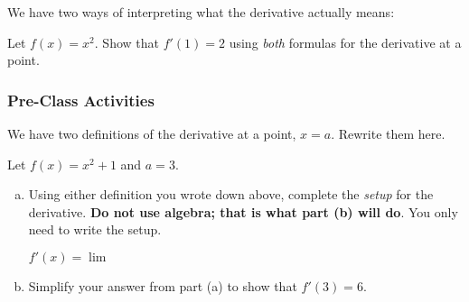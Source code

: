 \documentclass[notes]{subfiles}
\begin{document}
		We have two ways of interpreting what the derivative actually means:
		\begin{ex}
			Let $f(x) = x^2$.  Show that $f'(1) = 2$ using \emph{both} formulas for the derivative at a point.
		\end{ex}
			\newpage
		
	\subsubsection*{Pre-Class Activities}	
		\begin{ex}
			We have two definitions of the derivative at a point, $x = a$.  Rewrite them here.
		\end{ex}
			
		\begin{ex}
			Let $f(x) = x^2 + 1$ and $a = 3$.
			\begin{enumerate}[(a)]
				\item Using either definition you wrote down above, complete the \emph{setup} for the derivative.  \textbf{Do not use algebra; that is what part (b) will do}.  You only need to write the setup. \\[20pt]
					\begin{minipage}{3in}
						\begin{flushright}
						\Large{$f'(x) = \lim$}
						\end{flushright}
					\end{minipage}
				
				\item Simplify your answer from part (a) to show that $f'(3) = 6$.
			\end{enumerate}
		\end{ex}
		
\end{document}
